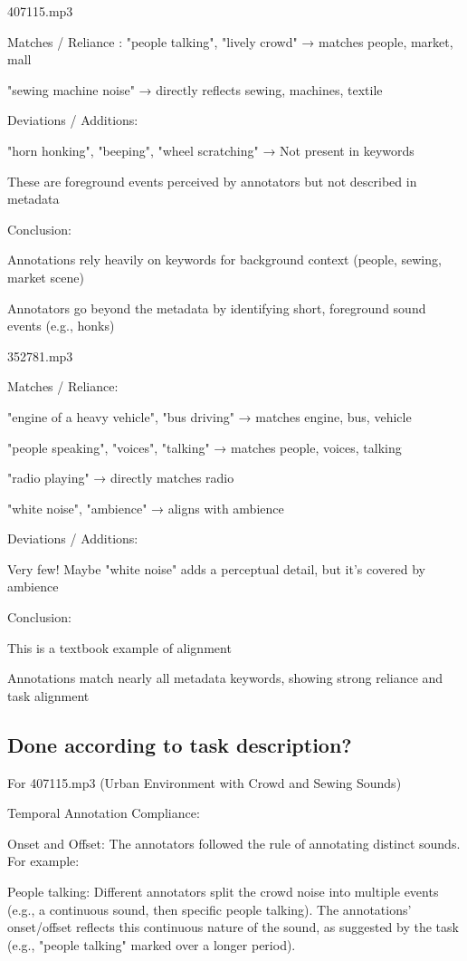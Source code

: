 \documentclass{article}
\begin{document}
407115.mp3

Matches / Reliance : "people talking", "lively crowd" → matches people, market, mall

"sewing machine noise" → directly reflects sewing, machines, textile

Deviations / Additions:

"horn honking", "beeping", "wheel scratching" → Not present in keywords

These are foreground events perceived by annotators but not described in metadata

Conclusion:

Annotations rely heavily on keywords for background context (people, sewing, market scene)

Annotators go beyond the metadata by identifying short, foreground sound events (e.g., honks)

352781.mp3

Matches / Reliance:

"engine of a heavy vehicle", "bus driving" → matches engine, bus, vehicle

"people speaking", "voices", "talking" → matches people, voices, talking

"radio playing" → directly matches radio

"white noise", "ambience" → aligns with ambience

Deviations / Additions:

Very few! Maybe "white noise" adds a perceptual detail, but it’s covered by ambience

Conclusion:

This is a textbook example of alignment

Annotations match nearly all metadata keywords, showing strong reliance and task alignment

\subsection{Done according to task description?}

For 407115.mp3 (Urban Environment with Crowd and Sewing Sounds)

Temporal Annotation Compliance:

Onset and Offset: The annotators followed the rule of annotating distinct sounds. For example:

People talking: Different annotators split the crowd noise into multiple events (e.g., a continuous sound, then specific people talking). The annotations' onset/offset reflects this continuous nature of the sound, as suggested by the task (e.g., "people talking" marked over a longer period).
\end{document}

